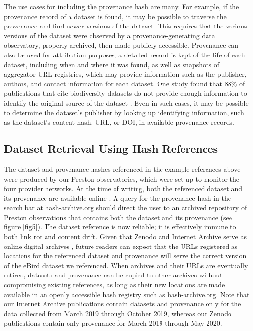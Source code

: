 The use cases for including the provenance hash are many. For example, if the provenance record of a dataset is found, it may be possible to traverse the provenance and find newer versions of the dataset. This requires that the various versions of the dataset were observed by a provenance-generating data observatory, properly archived, then made publicly accessible. Provenance can also be used for attribution purposes; a detailed record is kept of the life of each dataset, including when and where it was found, as well as snapshots of aggregator URL registries, which may provide information such as the publisher, authors, and contact information for each dataset. One study found that 88\% of publications that cite biodiversity datasets do not provide enough information to identify the original source of the dataset \citep{Escribano2018}. Even in such cases, it may be possible to determine the dataset's publisher by looking up identifying information, such as the dataset's content hash, URL, or DOI, in available provenance records.

\subsection*{Dataset Retrieval Using Hash References}
The dataset and provenance hashes referenced in the example references above were produced by our Preston observatories, which were set up to monitor the four provider networks. At the time of writing, both the referenced dataset and its provenance are available online \citep{poelen_archive_gib,poelen_archive_bhl,poelen_archive_dataone,poelen_zenodo_dataone,poelen_zenodo_bhl,poelen_zenodo_gib}. A query for the provenance hash in the search bar at hash-archive.org should direct the user to an archived repository of Preston observations that contains both the dataset and its provenance (see figure \ref{fig5}). The dataset reference is now reliable; it is effectively immune to both link rot and content drift. Given that Zenodo and Internet Archive serve as online digital archives \citep{zenodo_2019,archive_2020}, future readers can expect that the URLs registered as locations for the referenced dataset and provenance will serve the correct version of the eBird dataset we referenced. When archives and their URLs are eventually retired, datasets and provenance can be copied to other archives without compromising existing references, as long as their new locations are made available in an openly accessible hash registry such as hash-archive.org. Note that our Internet Archive publications \citep{poelen_archive_gib,poelen_archive_bhl,poelen_archive_dataone} contain datasets and provenance only for the data collected from March 2019 through October 2019, whereas our Zenodo publications \citep{poelen_zenodo_dataone,poelen_zenodo_bhl,poelen_zenodo_gib} contain only provenance for March 2019 through May 2020.

